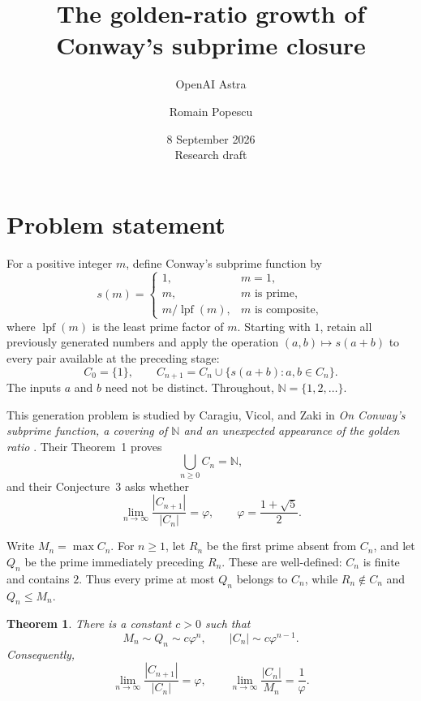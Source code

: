 \documentclass[11pt,letterpaper]{article}
\title{The golden-ratio growth of\\Conway's subprime closure}
\author{OpenAI Astra \and Romain Popescu}
\date{8 September 2026\\[3pt]\small Research draft}
\numberwithin{equation}{section}
\newtheorem{theorem}{Theorem}[section]
\theoremstyle{remark}
\DeclareMathOperator{\lpf}{lpf}
\newcommand{\N}{\mathbb N}
\newcommand{\ph}{\varphi}
\begin{document}
\maketitle
\vspace{-1.2em}

\section{Problem statement}

For a positive integer $m$, define Conway's subprime function by
\[
 s(m)=
 \begin{cases}
  1,&m=1,\\
  m,&m\text{ is prime},\\
  m/\lpf(m),&m\text{ is composite},
 \end{cases}
\]
where $\lpf(m)$ is the least prime factor of $m$. Starting with $1$, retain
all previously generated numbers and apply the operation $(a,b)\mapsto s(a+b)$
to every pair available at the preceding stage:
\begin{equation}\label{eq:closure}
 C_0=\{1\},\qquad
 C_{n+1}=C_n\cup\{s(a+b):a,b\in C_n\}.
\end{equation}
The inputs $a$ and $b$ need not be distinct. Throughout, $\N=\{1,2,\ldots\}$.

This generation problem is studied by Caragiu, Vicol, and Zaki in
\emph{On Conway's subprime function, a covering of $\N$ and an unexpected
appearance of the golden ratio} \cite{CVZ}. Their Theorem~1 proves
\begin{equation}\label{eq:exhaustion}
 \bigcup_{n\ge0}C_n=\N,
\end{equation}
and their Conjecture~3 asks whether
\begin{equation}\label{eq:conjecture}
 \lim_{n\to\infty}\frac{|C_{n+1}|}{|C_n|}
 =\ph,\qquad \ph=\frac{1+\sqrt5}{2}.
\end{equation}

Write $M_n=\max C_n$. For $n\ge1$, let $R_n$ be the first prime absent
from $C_n$, and let $Q_n$ be the prime immediately preceding $R_n$.
These are well-defined: $C_n$ is finite and contains $2$. Thus every prime
at most $Q_n$ belongs to $C_n$, while $R_n\notin C_n$ and $Q_n\le M_n$.

\begin{theorem}\label{thm:main}
There is a constant $c>0$ such that
\begin{equation}\label{eq:main-scales}
 M_n\sim Q_n\sim c\ph^n,\qquad |C_n|\sim c\ph^{n-1}.
\end{equation}
Consequently,
\begin{equation}\label{eq:main-limits}
 \lim_{n\to\infty}\frac{|C_{n+1}|}{|C_n|}=\ph,
 \qquad
 \lim_{n\to\infty}\frac{|C_n|}{M_n}=\frac1\ph.
\end{equation}
\end{theorem}
\end{document}
